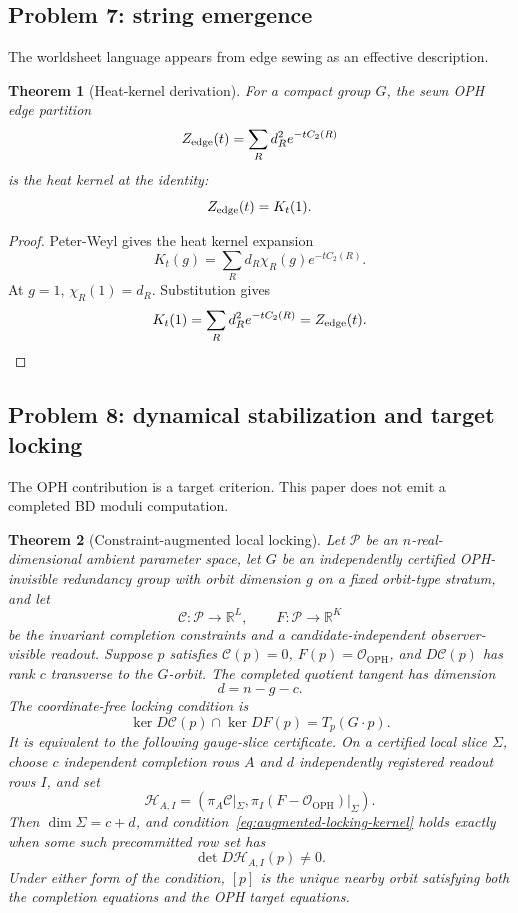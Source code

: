 \documentclass[11pt]{article}
\newtheorem{theorem}{Theorem}[section]
\theoremstyle{remark}
\theoremstyle{plain}
\newcommand{\OPH}{\mathrm{OPH}}
\begin{document}
\subsection{Problem 7: string emergence}

The worldsheet language appears from edge sewing as an effective description.

\begin{theorem}[Heat-kernel derivation]
For a compact group \(G\), the sewn OPH edge partition
\[
Z_{\rm edge}(t)=\sum_R d_R^2e^{-tC_2(R)}
\]
is the heat kernel at the identity:
\[
Z_{\rm edge}(t)=K_t(1).
\]
\end{theorem}

\begin{proof}
Peter-Weyl gives the heat kernel expansion
\[
K_t(g)=\sum_R d_R\chi_R(g)e^{-tC_2(R)}.
\]
At \(g=1\), \(\chi_R(1)=d_R\). Substitution gives
\[
K_t(1)=\sum_R d_R^2e^{-tC_2(R)}=Z_{\rm edge}(t).
\]
\end{proof}

\subsection{Problem 8: dynamical stabilization and target locking}

The OPH contribution is a target criterion. This paper does not emit a completed BD moduli computation.

\begin{theorem}[Constraint-augmented local locking]
\label{thm:constraint-augmented-locking}
Let \(\mathcal P\) be an \(n\)-real-dimensional ambient parameter space, let \(G\) be an
independently certified OPH-invisible redundancy group with orbit dimension \(g\) on a fixed
orbit-type stratum, and let
\[
\mathcal C:\mathcal P\longrightarrow\mathbb R^L,
\qquad
F:\mathcal P\longrightarrow\mathbb R^K
\]
be the invariant completion constraints and a candidate-independent observer-visible readout.
Suppose \(p\) satisfies \(\mathcal C(p)=0\), \(F(p)=\mathcal O_{\OPH}\), and
\(D\mathcal C(p)\) has rank \(c\) transverse to the \(G\)-orbit. The completed quotient tangent
has dimension
\[
d=n-g-c.
\]
The coordinate-free locking condition is
\[
\ker D\mathcal C(p)\cap\ker DF(p)=T_p(G\!\cdot p).
\label{eq:augmented-locking-kernel}
\]
It is equivalent to the following gauge-slice certificate. On a certified local slice \(\Sigma\),
choose \(c\) independent completion rows \(A\) and \(d\) independently registered readout rows
\(I\), and set
\[
\mathcal H_{A,I}
=
\left(
\pi_A\mathcal C|_\Sigma,
\pi_I(F-\mathcal O_{\OPH})|_\Sigma
\right).
\]
Then \(\dim\Sigma=c+d\), and condition~\eqref{eq:augmented-locking-kernel} holds exactly when some such precommitted row set
has
\[
\det D\mathcal H_{A,I}(p)\ne0.
\]
Under either form of the condition, \([p]\) is the unique nearby orbit satisfying both the
completion equations and the OPH target equations.
\end{theorem}
\end{document}
